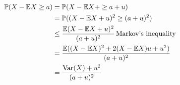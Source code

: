 \begin{align*}
    \mathbb P(X - \mathbb{E} X \geq a) &= \mathbb P( X - \mathbb{E} X + \geq a+ u)\\
			&= \mathbb P( (X- \mathbb{E} X + u)^2 \geq (a+u)^2)\\
			&\leq \frac{\mathbb{E} (X - \mathbb{E} X + u)^2}{(a+u)^2} \, \mbox{Markov's inequality} \\
			&= \frac{\mathbb{E}( (X - \mathbb{E} X)^2 + 2(X - \mathbb{E} X)u + u^2)}{(a+u)^2} \\
			&= \frac{\mathrm{Var}(X) + u^2}{(a+u)^2} 
\end{align*}

